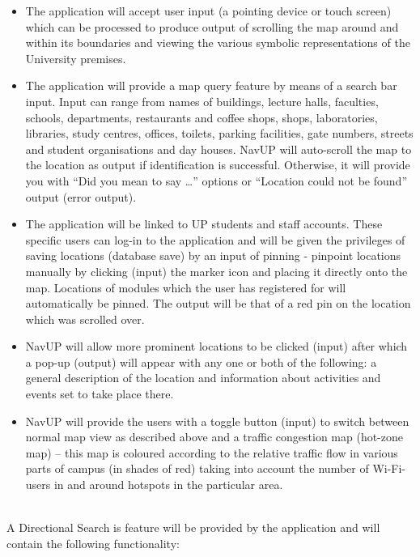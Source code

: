 \documentclass[runningheads,a4paper]{llncs}
\begin{document}
\begin{itemize}

\item The application will accept user input (a pointing device or touch screen) which can be processed to produce output of scrolling the map around and within its boundaries and viewing the various symbolic representations of the University premises.

\item The application will provide a map query feature by means of a search bar input. Input can range from names of buildings, lecture halls, faculties, schools, departments, restaurants and coffee shops, shops, laboratories, libraries, study centres, offices, toilets,  parking facilities, gate numbers, streets and student organisations and day houses. NavUP will auto-scroll the map to the location as output if identification is successful. Otherwise, it will provide you with “Did you mean to say …” options or “Location could not be found” output (error output).

\item The application will be linked to UP students and staff accounts. These specific users can log-in to the application and will be given the privileges of saving locations (database save) by an input of pinning - pinpoint locations manually by clicking (input) the marker icon and placing it directly onto the map. Locations of modules which the user has registered for will automatically be pinned. The output will be that of a red pin on the location which was scrolled over.

\item NavUP will allow more prominent locations to be clicked (input) after which a pop-up (output) will appear with any one or both of the following: a general description of the location and information about activities and events set to take place there.

\item NavUP will provide the users with a toggle button (input) to switch between normal map view as described above and a traffic congestion map (hot-zone map) – this map is coloured according to the relative traffic flow in various parts of campus (in shades of red) taking into account the number of Wi-Fi-users in and around hotspots in the particular area.

\end{itemize}

\let\labelitemi\labelitemii

\noindent \\A Directional Search is feature will be provided by the application and will contain the following functionality:
\end{document}
